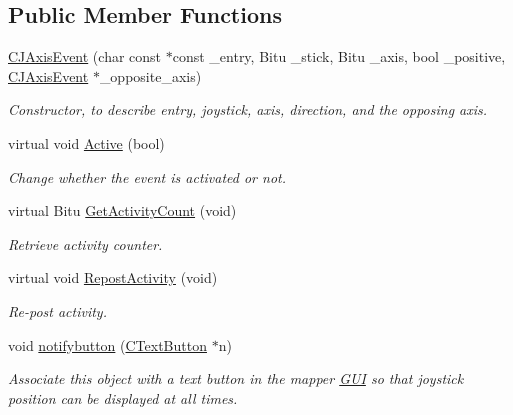 \subsection*{Public Member Functions}
\begin{DoxyCompactItemize}
\item 
\hypertarget{classCJAxisEvent_a9cf7657ec986985dd15efcb92b20a380}{\hyperlink{classCJAxisEvent_a9cf7657ec986985dd15efcb92b20a380}{C\-J\-Axis\-Event} (char const $\ast$const \-\_\-entry, Bitu \-\_\-stick, Bitu \-\_\-axis, bool \-\_\-positive, \hyperlink{classCJAxisEvent}{C\-J\-Axis\-Event} $\ast$\-\_\-opposite\-\_\-axis)}\label{classCJAxisEvent_a9cf7657ec986985dd15efcb92b20a380}

\begin{DoxyCompactList}\small\item\em Constructor, to describe entry, joystick, axis, direction, and the opposing axis. \end{DoxyCompactList}\item 
\hypertarget{classCJAxisEvent_a1f0618c1d74612e06892430bdf7d8f92}{virtual void \hyperlink{classCJAxisEvent_a1f0618c1d74612e06892430bdf7d8f92}{Active} (bool)}\label{classCJAxisEvent_a1f0618c1d74612e06892430bdf7d8f92}

\begin{DoxyCompactList}\small\item\em Change whether the event is activated or not. \end{DoxyCompactList}\item 
\hypertarget{classCJAxisEvent_af6c1eaff5b1c3f1dc2b2715b76156ea4}{virtual Bitu \hyperlink{classCJAxisEvent_af6c1eaff5b1c3f1dc2b2715b76156ea4}{Get\-Activity\-Count} (void)}\label{classCJAxisEvent_af6c1eaff5b1c3f1dc2b2715b76156ea4}

\begin{DoxyCompactList}\small\item\em Retrieve activity counter. \end{DoxyCompactList}\item 
\hypertarget{classCJAxisEvent_abc322cf9dcf5488f49cb421f74574968}{virtual void \hyperlink{classCJAxisEvent_abc322cf9dcf5488f49cb421f74574968}{Repost\-Activity} (void)}\label{classCJAxisEvent_abc322cf9dcf5488f49cb421f74574968}

\begin{DoxyCompactList}\small\item\em Re-\/post activity. \end{DoxyCompactList}\item 
\hypertarget{classCJAxisEvent_a523cca4f5afb972c28c5aa71ff3f408f}{void \hyperlink{classCJAxisEvent_a523cca4f5afb972c28c5aa71ff3f408f}{notifybutton} (\hyperlink{classCTextButton}{C\-Text\-Button} $\ast$n)}\label{classCJAxisEvent_a523cca4f5afb972c28c5aa71ff3f408f}

\begin{DoxyCompactList}\small\item\em Associate this object with a text button in the mapper \hyperlink{namespaceGUI}{G\-U\-I} so that joystick position can be displayed at all times. \end{DoxyCompactList}\end{DoxyCompactItemize}
